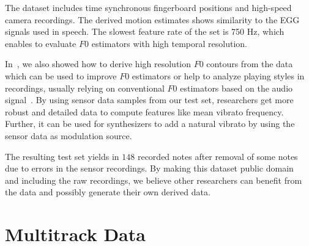\par
The dataset includes time synchronous fingerboard positions and high-speed camera recordings. 
The derived motion estimates shows similarity to the EGG signals used in speech. 
The slowest feature rate of the set is 750 Hz, which enables to evaluate $F0$ estimators with high temporal resolution. 
\par
In~\cite{stoeter15acm}, we also showed how to derive high resolution $F0$ contours from the data which can be used to improve $F0$ estimators or help to analyze playing styles in recordings, usually relying on conventional $F0$ estimators based on the audio signal~\cite{mellody2000time}. 
By using sensor data samples from our test set, researchers get more robust and detailed data to compute features like mean vibrato frequency. 
Further, it can be used for synthesizers to add a natural vibrato by using the sensor data as modulation source.
\par
The resulting test set yields in $148$ recorded notes after removal of some notes due to errors in the sensor recordings.
By making this dataset public domain~\cite{oss_muserc} and including the raw recordings, we believe other researchers can benefit from the data and possibly generate their own derived data.

\section{Multitrack Data}%
\label{sec:multitrack}


